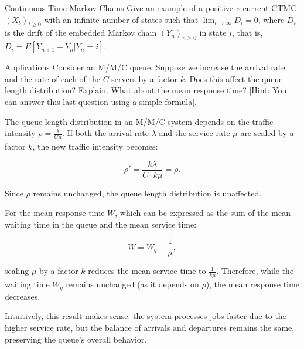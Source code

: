 \begin{problem}{Continuous-Time Markov Chains}
Give an example of a positive recurrent CTMC $(X_t)_{t\geq 0}$ with an infinite number of states such that $\lim_{i\rightarrow\infty} D_i = 0$, where $D_i$ is the drift of the embedded Markov chain $(Y_n)_{n\geq 0}$ in state $i$, that is, $D_i = E[Y_{n+1} - Y_n|Y_n = i]$.
\end{problem}

\begin{problem}{Applications}
Consider an M/M/C queue. Suppose we increase the arrival rate and the rate of each of the $C$ servers by a factor $k$. Does this affect the queue length distribution? Explain. What about the mean response time? [Hint: You can answer this last question using a simple formula].
\end{problem}
\begin{solution}
The queue length distribution in an M/M/C system depends on the traffic intensity $\rho = \frac{\lambda}{C\mu}$. If both the arrival rate $\lambda$ and the service rate $\mu$ are scaled by a factor $k$, the new traffic intensity becomes:

\[
\rho' = \frac{k\lambda}{C \cdot k\mu} = \rho.
\]

Since $\rho$ remains unchanged, the queue length distribution is unaffected.

For the mean response time $W$, which can be expressed as the sum of the mean waiting time in the queue and the mean service time:

\[
W = W_q + \frac{1}{\mu},
\]

scaling $\mu$ by a factor $k$ reduces the mean service time to $\frac{1}{k\mu}$. Therefore, while the waiting time $W_q$ remains unchanged (as it depends on $\rho$), the mean response time decreases.

Intuitively, this result makes sense: the system processes jobs faster due to the higher service rate, but the balance of arrivals and departures remains the same, preserving the queue's overall behavior.
\end{solution}

